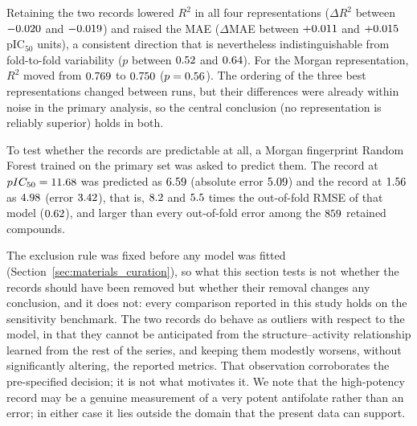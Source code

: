 \begin{table}[htbp]
	\centering
	\caption{Nested cross-validation performance without (primary analysis, $n = \OutlierNMain$) and with ($n = \OutlierNSens$) the two extreme-potency records. $p$-values compare the two runs with a Welch test using the Nadeau-Bengio variance correction \citep{nadeau2003}; the runs use different fold partitions, so folds are not paired.}
	\label{tab:outlier_sensitivity}
\end{table}

Retaining the two records lowered $R^2$ in all four representations ($\Delta R^2$ between $-0.020$ and $-0.019$) and raised the MAE ($\Delta$MAE between $+0.011$ and $+0.015$ pIC$_{50}$ units), a consistent direction that is nevertheless indistinguishable from fold-to-fold variability ($p$ between $0.52$ and $0.64$). For the Morgan representation, $R^2$ moved from $0.769$ to $0.750$ ($p = 0.56$). The ordering of the three best representations changed between runs, but their differences were already within noise in the primary analysis, so the central conclusion (no representation is reliably superior) holds in both.

To test whether the records are predictable at all, a Morgan fingerprint Random Forest trained on the primary set was asked to predict them. The record at $pIC_{50} = 11.68$ was predicted as $6.59$ (absolute error $5.09$) and the record at $1.56$ as $4.98$ (error $3.42$), that is, $8.2$ and $5.5$ times the out-of-fold RMSE of that model ($0.62$), and larger than every out-of-fold error among the $859$ retained compounds.

The exclusion rule was fixed before any model was fitted (Section~\ref{sec:materials_curation}), so what this section tests is not whether the records should have been removed but whether their removal changes any conclusion, and it does not: every comparison reported in this study holds on the sensitivity benchmark. The two records do behave as outliers with respect to the model, in that they cannot be anticipated from the structure--activity relationship learned from the rest of the series, and keeping them modestly worsens, without significantly altering, the reported metrics. That observation corroborates the pre-specified decision; it is not what motivates it. We note that the high-potency record may be a genuine measurement of a very potent antifolate rather than an error; in either case it lies outside the domain that the present data can support.

